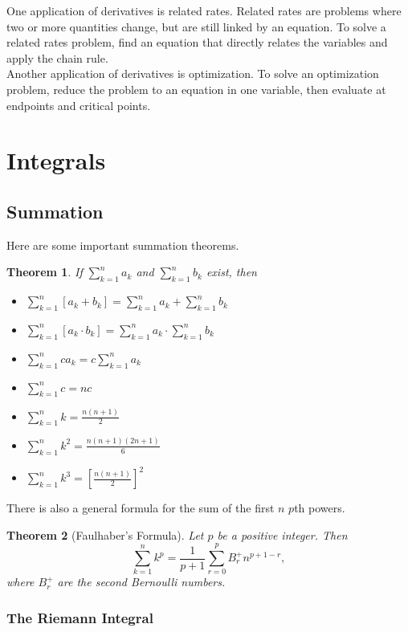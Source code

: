 \documentclass[11pt]{scrartcl}
\theoremstyle{plain}
\newtheorem{theorem}{Theorem}[section]
\theoremstyle{definition}
\theoremstyle{remark}
\begin{document}
One application of derivatives is related rates. Related rates are problems where two or more quantities change,
but are still linked by an equation. To solve a related rates problem, find an equation that directly relates 
the variables and apply the chain rule. \\[-0.5em]

Another application of derivatives is optimization. To solve an optimization problem, reduce the problem to an
equation in one variable, then evaluate at endpoints and critical points.

\newpage
\section{Integrals}
\subsection{Summation}

Here are some important summation theorems.

\begin{theorem}
    If $\sum_{k=1}^n a_k$ and $\sum_{k=1}^n b_k$ exist, then
    \begin{itemize}
        \item $\sum_{k=1}^n [a_k+b_k]=\sum_{k=1}^n a_k+\sum_{k=1}^n b_k$
        \item $\sum_{k=1}^n [a_k\cdot b_k]=\sum_{k=1}^n a_k\cdot\sum_{k=1}^n b_k$
        \item $\sum_{k=1}^n ca_k=c\sum_{k=1}^n a_k$
        \item $\sum_{k=1}^n c=nc$
        \item $\sum_{k=1}^n k=\frac{n(n+1)}{2}$
        \item $\sum_{k=1}^n k^{2}=\frac{n(n+1)(2n+1)}{6}$
        \item $\sum_{k=1}^n k^{3}=\left[ \frac{n(n+1)}{2} \right]^{2}$
    \end{itemize}
\end{theorem}

There is also a general formula for the sum of the first $n$ $p$th powers.

\begin{theorem}[Faulhaber's Formula]
    Let $p$ be a positive integer. Then
    \[ \sum_{k=1}^n k^p=\frac{1}{p+1}\sum_{r=0}^p B_{r}^+ n^{p+1-r},\]
    where $B_{r}^+$ are the second Bernoulli numbers. 
\end{theorem}

\subsubsection{The Riemann Integral}
\end{document}
